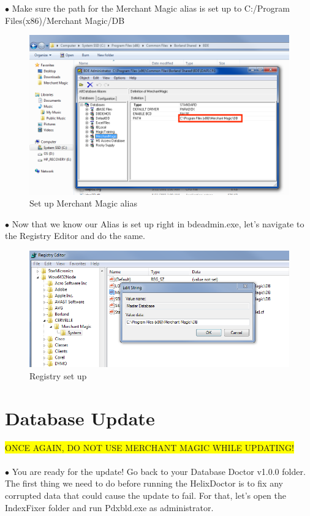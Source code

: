 \documentclass[a4paper, 11pt]{article}
\begin{document}
\pagebreak

\vspace*{\fill}
$\bullet$ Make sure the path for the Merchant Magic alias is set up to C:/Program Files(x86)/Merchant Magic/DB

\begin{figure}[h]
    \centering
    \includegraphics[width=\textwidth]{capture 15}
    \caption{Set up Merchant Magic alias}
\end{figure}
\vspace*{\fill}

\pagebreak

\vspace*{\fill}
$\bullet$ Now that we know our Alias is set up right in bdeadmin.exe, let's navigate to the Registry Editor and do the same.

\begin{figure}[h]
    \centering
    \includegraphics[width=\textwidth]{capture 17}
    \caption{Registry set up}
\end{figure}
\vspace*{\fill}

\pagebreak

\section{Database Update}
\colorbox{yellow}{ONCE AGAIN, DO NOT USE MERCHANT MAGIC WHILE UPDATING!}\\\\
$\bullet$ You are ready for the update! Go back to your Database Doctor v1.0.0 folder. The first thing we need to do before running the HelixDoctor is to fix any corrupted data that could cause the update to fail. For that, let's open the IndexFixer folder and run Pdxbld.exe as administrator.
\end{document}
